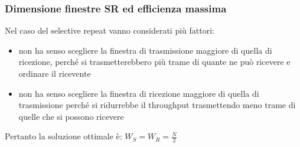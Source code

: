 \subsubsection{Dimensione finestre SR ed efficienza massima}
Nel caso del selective repeat vanno considerati più fattori:

\begin{itemize}
    \item non ha senso scegliere la finestra di
trasmissione maggiore di quella di ricezione, perché si
trasmetterebbero più trame di quante ne può ricevere e
ordinare il ricevente
    \item  non ha senso scegliere la finestra di
ricezione maggiore di quella di trasmissione perché si
ridurrebbe il throughput trasmettendo meno trame di quelle
che si possono ricevere
\end{itemize}
Pertanto la soluzione ottimale è: $W_S = W_R = \frac{N}{2}$
